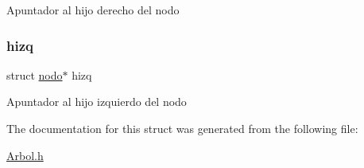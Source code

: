 Apuntador al hijo derecho del nodo \mbox{\label{structnodo_aa55874eca5bf114bf94e1d5d622bdd42}} 
\subsubsection{\texorpdfstring{hizq}{hizq}}
{\footnotesize\ttfamily struct \mbox{\hyperlink{structnodo}{nodo}}$\ast$ hizq}

Apuntador al hijo izquierdo del nodo 

The documentation for this struct was generated from the following file\+:\begin{DoxyCompactItemize}
\item 
\mbox{\hyperlink{_arbol_8h}{Arbol.\+h}}\end{DoxyCompactItemize}
